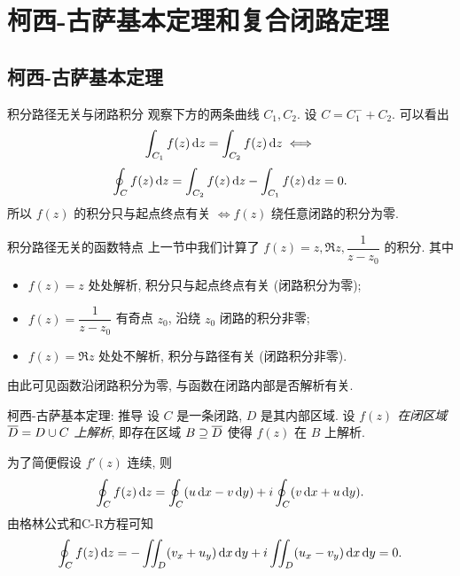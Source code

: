 \section{柯西-古萨基本定理和复合闭路定理}

\subsection{柯西-古萨基本定理}
\begin{frame}{积分路径无关与闭路积分}
\onslide<+->
观察下方的两条曲线 $C_1,C_2$.
\onslide<+->
设 $C=C_1^-+C_2$.
\onslide<+->
可以看出
\[\int_{C_1}f(z)\,\mathrm{d} z=\int_{C_2}f(z)\,\mathrm{d} z\iff\]
\[\oint_Cf(z)\,\mathrm{d} z=\int_{C_2}f(z)\,\mathrm{d} z-\int_{C_1}f(z)\,\mathrm{d} z=0.\]
\onslide<+->
所以 $f(z)$ 的积分只与起点终点有关 $\iff f(z)$ 绕任意闭路的积分为零.
\begin{center}
\end{center}
\end{frame}


\begin{frame}{积分路径无关的函数特点}
\onslide<+->
上一节中我们计算了 $f(z)=z,\Re z,\dfrac1{z-z_0}$ 的积分.
\onslide<+->
其中
\begin{itemize}
\item $f(z)=z$ 处处解析, 积分只与起点终点有关 (闭路积分为零);
\item $f(z)=\dfrac1{z-z_0}$ 有奇点 $z_0$, 沿绕 $z_0$ 闭路的积分非零;
\item $f(z)=\Re z$ 处处不解析, 积分与路径有关 (闭路积分非零).
\end{itemize}
\onslide<+->
由此可见函数沿闭路积分为零,
\onslide<+->
与函数在闭路内部是否解析有关.
\end{frame}


\begin{frame}{柯西-古萨基本定理: 推导}
\onslide<+->
设 $C$ 是一条闭路, $D$ 是其内部区域.
\onslide<+->
设 \emph{$f(z)$ 在闭区域 $\overline D=D\cup C$ 上解析},
\onslide<+->
即存在区域 $B\supseteq\overline D$ 使得 $f(z)$ 在 $B$ 上解析.

\onslide<+->
为了简便假设 $f'(z)$ 连续,
\onslide<+->
则
\[\oint_Cf(z)\,\mathrm{d} z=\oint_C(u\,\mathrm{d} x-v\,\mathrm{d} y)
+i\oint_C(v\,\mathrm{d} x+u\,\mathrm{d} y).\]
\onslide<+->
由格林公式和C-R方程可知
\[\oint_Cf(z)\,\mathrm{d} z=-\iint_D(v_x+u_y)\,\mathrm{d} x\,\mathrm{d} y
+i\iint_D(u_x-v_y)\,\mathrm{d} x\,\mathrm{d} y=0.\]
\end{frame}


